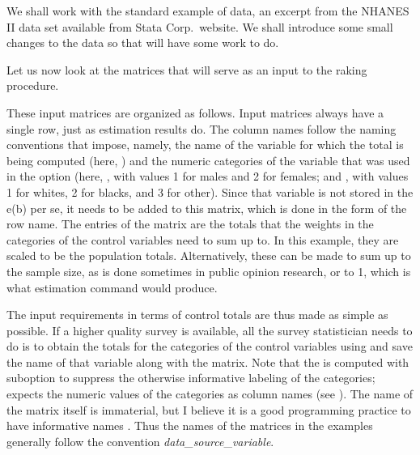 \begin{stexample}[Example 1]

We shall work with the standard example of  data,
an excerpt from the NHANES II data set available from Stata Corp.\ website.
We shall introduce some small changes to the data so that
 will have some work to do.

\begin{stlog}
\nullskip
\end{stlog}

Let us now look at the matrices that will serve as an input to the
raking procedure.

\begin{stlog}
\nullskip
\end{stlog}

These input matrices are organized as follows. Input matrices always
have a single row, just as estimation results  do. The column
names follow the naming conventions that  impose, namely,
the name of the variable for which the total is being computed 
(here, ) and the numeric categories of the variable that
was used in the  option (here, , with values 1 for males
and 2 for females; and , with values 1 for whites, 2 for blacks,
and 3 for other). Since that variable is not stored in the e(b) per se,
it needs to be added to this matrix, which is done in the form of the row name.
The entries of the matrix are the totals that the weights in the categories
of the control variables need to sum up to. In this example, they are scaled
to be the population totals. Alternatively, these can be made to sum up to the 
sample size, as is done sometimes in public opinion research, or to 1, which
is what  estimation command would produce.

The input requirements in terms of control totals are thus made as simple as possible.
If a higher quality survey is available, all the survey statistician needs to do
is to obtain the totals for the categories of the control variables
using 
and save the name of that variable along with the matrix.
Note that the 
is computed with  suboption to suppress
the otherwise informative labeling of the categories;
 expects the numeric values of the categories
as column names (see ).
The name of the matrix itself is immaterial, but I believe it is
a good programming practice
to have informative names \citep{mcconnell:2004}. Thus the names
of the matrices in the examples generally follow the convention
{\it data{\_}source}{\_}{\it variable}.


\end{stexample}
